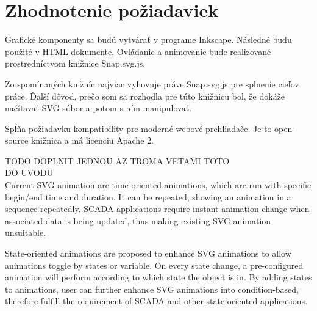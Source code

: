 %
% 




\section{Zhodnotenie požiadaviek}
Grafické komponenty sa budú vytvárať v programe Inkscape. Následné budu použité v HTML dokumente. Ovládanie a animovanie bude realizované prostredníctvom knižnice Snap.svg.js. 

Zo spomínaných knižníc najviac vyhovuje práve Snap.svg.js pre splnenie cieľov práce.
Ďalší dôvod, prečo som sa rozhodla pre túto  knižnicu bol, že dokáže načítavať SVG súbor a potom s ním manipulovať.
 
Spĺňa požiadavku kompatibility pre moderné webové prehliadače. Je to open-source knižnica a má licenciu Apache 2.



TODO DOPLNIT JEDNOU AZ TROMA VETAMI TOTO \\

DO UVODU \\
Current SVG animation are time-oriented animations, which are run with specific begin/end time and duration. It can be repeated, showing an animation in a sequence repeatedly. SCADA applications require instant animation change when associated data is being updated, thus making existing SVG animation unsuitable.


State-oriented animations are proposed to enhance SVG animations to allow animations toggle by states or variable. On every state change, a pre-configured animation will perform according to which state the object is in. By adding states to animations, user can further enhance SVG animations into condition-based, therefore fulfill the requirement of SCADA and other state-oriented applications.

